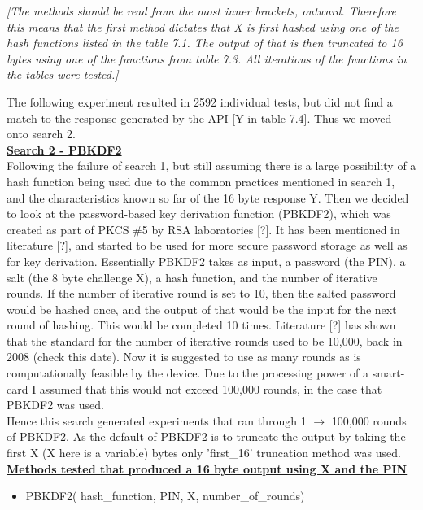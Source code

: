 \documentclass[bsc,frontabs,twoside,singlespacing,parskip,deptreport]{infthesis}     %
\begin{document}
\textit{[The methods should be read from the most inner brackets, outward. Therefore this means that the first method dictates that X is first hashed using one of the hash functions listed in the table 7.1. The output of that is then truncated to 16 bytes using one of the functions from table 7.3. All iterations of the functions in the tables were tested.]}

The following experiment resulted in 2592 individual tests, but did not find a match to the response generated by the API [Y in table 7.4]. Thus we moved onto search 2.\\


\textbf{\underline{Search 2 - PBKDF2}}\\
Following the failure of search 1, but still assuming there is a large possibility of a hash function being used due to the common practices mentioned in search 1, and the characteristics known so far of the 16 byte response Y. Then we decided to look at the password-based key derivation function (PBKDF2), which was created as part of PKCS \#5 by RSA laboratories [?]. It has been mentioned in literature [?], and started to be used for more secure password storage as well as for key derivation. Essentially PBKDF2 takes as input, a password (the PIN), a salt (the 8 byte challenge X), a hash function, and the number of iterative rounds. If the number of iterative round is set to 10, then the salted password would be hashed once, and the output of that would be the input for the next round of hashing. This would be completed 10 times. Literature [?] has shown that the standard for the number of iterative rounds used to be 10,000, back in 2008 (check this date). Now it is suggested to use as many rounds as is computationally feasible by the device. Due to the processing power of a smart-card I assumed that this would not exceed 100,000 rounds, in the case that PBKDF2 was used.\\

Hence this search generated experiments that ran through 1 $\rightarrow$ 100,000 rounds of PBKDF2. As the default of PBKDF2 is to truncate the output by taking the first X (X here is a variable) bytes only 'first\_16' truncation method was used.\\

\underline{\textbf{Methods tested that produced a 16 byte output using X and the PIN}}
\begin{itemize}
\item PBKDF2( hash\_function, PIN, X, number\_of\_rounds)
\end{itemize}
\end{document}

